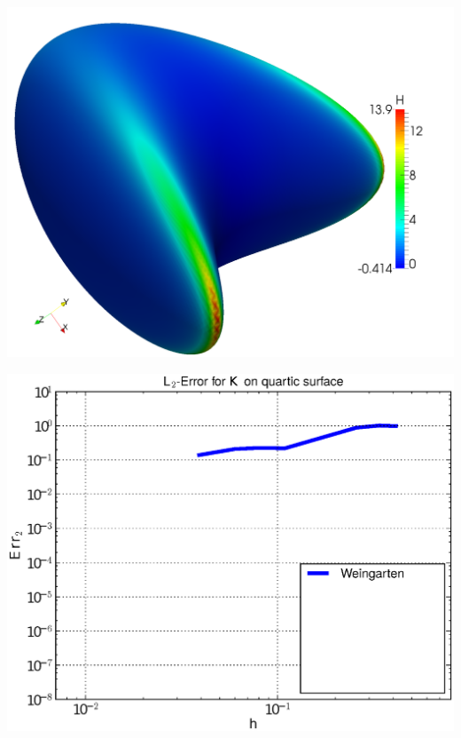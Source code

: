 \documentclass[handout]{beamer}
\begin{document}
\begin{frame}
\begin{overprint}
\begin{minipage}[t]{0.49\textwidth}
              \centering\includegraphics[width=\textwidth]{bilder/Curvature/heineB/H250k.png}
          \end{minipage}
          \begin{minipage}[t]{0.49\textwidth}
            \centering\includegraphics[width=\textwidth]{bilder/Curvature/heineB/ErrKL2_1.eps}
          \end{minipage}\hfill
          \begin{minipage}[t]{0.49\textwidth}

\end{minipage}
\end{overprint}
\end{frame}
\end{document}

